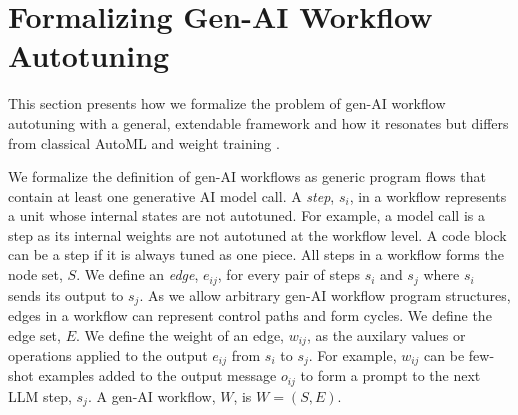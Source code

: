 \section{Formalizing Gen-AI Workflow Autotuning}
\label{sec:theory}

This section presents how we formalize the problem of gen-AI workflow autotuning with a general, extendable framework and how it resonates but differs from classical AutoML \cite{hutter2019automated} and weight training \cite{rumelhart1986learning}.

We formalize the definition of gen-AI workflows as generic program flows that contain at least one generative AI model call. A {\em step}, $s_i$, in a workflow represents a unit whose internal states are not autotuned. For example, a model call is a step as its internal weights are not autotuned at the workflow level. A code block can be a step if it is always tuned as one piece. All steps in a workflow forms the node set, $S$. %
We define an {\em edge}, $e_{ij}$, for every pair of steps $s_i$ and $s_j$ where $s_i$ sends its output to $s_j$. As we allow arbitrary gen-AI workflow program structures, edges in a workflow can represent control paths and form cycles. We define the edge set, $E$. We define the weight of an edge, $w_{ij}$, as the auxilary values or operations applied to the output $e_{ij}$ from $s_i$ to $s_j$. For example, $w_{ij}$ can be few-shot examples added to the output message $o_{ij}$ to form a prompt to the next LLM step, $s_j$. %
A gen-AI workflow, $W$, is $W = (S,E)$.

